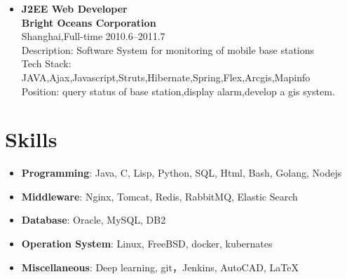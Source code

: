 \documentclass[a4paper,11pt]{res}
\begin{document}
\begin{resume}
\begin{itemize}
  \item{\bf J2EE Web Developer}\\ {\bf Bright Oceans Corporation}\\ Shanghai,Full-time \hfill 2010.6--2011.7\\

    Description: Software System for monitoring of mobile base stations\\
    
    Tech Stack: JAVA,Ajax,Javascript,Struts,Hibernate,Spring,Flex,Arcgis,Mapinfo\\
    
    Position: query status of base station,display alarm,develop a gis system.\\
  \end{itemize}

  \section{Skills}
  \begin{itemize}
  \item{\bf Programming}: Java, C, Lisp, Python, SQL, Html, Bash, Golang, Nodejs
  \item{\bf Middleware}: Nginx, Tomcat, Redis, RabbitMQ, Elastic Search
  \item{\bf Database}: Oracle, MySQL, DB2
  \item{\bf Operation System}: Linux, FreeBSD, docker, kubernates
  \item{\bf Miscellaneous}: Deep learning, git，Jenkins, AutoCAD, \LaTeX
  \end{itemize}

\end{resume}
\end{document}
